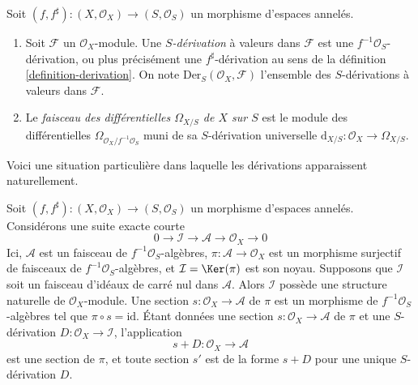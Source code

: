 \begin{definition}
\label{definition-differentials}
Soit $(f, f^\sharp) : (X, \mathcal{O}_X) \to (S, \mathcal{O}_S)$
un morphisme d'espaces annelés.
\begin{enumerate}
\item Soit $\mathcal{F}$ un $\mathcal{O}_X$-module. Une
{\it $S$-dérivation} à valeurs dans $\mathcal{F}$ est une
$f^{-1}\mathcal{O}_S$-dérivation, ou plus précisément une
$f^\sharp$-dérivation au sens de la définition
\ref{definition-derivation}. On note
$\text{Der}_S(\mathcal{O}_X, \mathcal{F})$ l'ensemble des $S$-dérivations
à valeurs dans $\mathcal{F}$.
\item Le {\it faisceau des différentielles $\Omega_{X/S}$ de $X$ sur $S$}
est le module des différentielles
$\Omega_{\mathcal{O}_X/f^{-1}\mathcal{O}_S}$ muni de sa $S$-dérivation
universelle $\text{d}_{X/S} : \mathcal{O}_X \to \Omega_{X/S}$.
\end{enumerate}
\end{definition}

\noindent
Voici une situation particulière dans laquelle les dérivations apparaissent
naturellement.

\begin{lemma}
\label{lemma-double-structure-gives-derivation}
Soit $(f, f^\sharp) : (X, \mathcal{O}_X) \to (S, \mathcal{O}_S)$
un morphisme d'espaces annelés. Considérons une suite exacte courte
$$
0 \to \mathcal{I} \to \mathcal{A} \to \mathcal{O}_X \to 0
$$
Ici, $\mathcal{A}$ est un faisceau de $f^{-1}\mathcal{O}_S$-algèbres,
$\pi : \mathcal{A} \to \mathcal{O}_X$ est un morphisme surjectif de
faisceaux de $f^{-1}\mathcal{O}_S$-algèbres, et
$\mathcal{I} = \Ker(\pi)$ est son noyau. Supposons que $\mathcal{I}$ soit
un faisceau d'idéaux de carré nul dans $\mathcal{A}$. Alors $\mathcal{I}$
possède une structure naturelle de $\mathcal{O}_X$-module.
Une section $s : \mathcal{O}_X \to \mathcal{A}$ de $\pi$ est un morphisme
de $f^{-1}\mathcal{O}_S$-algèbres tel que $\pi \circ s = \text{id}$.
Étant données une section $s : \mathcal{O}_X \to \mathcal{A}$ de $\pi$
et une $S$-dérivation $D : \mathcal{O}_X \to \mathcal{I}$, l'application
$$
s + D : \mathcal{O}_X \to \mathcal{A}
$$
est une section de $\pi$, et toute section $s'$ est de la forme $s + D$ pour
une unique $S$-dérivation $D$.
\end{lemma}

